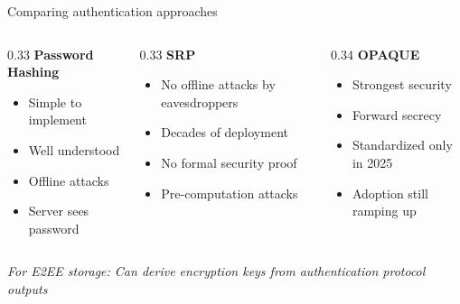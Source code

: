 \ifdefined\PRESENTATION\else\PassOptionsToClass{handout}{beamer}\fi\documentclass[aspectratio=169, lualatex]{beamer}
\begin{document}
\begin{frame}{Comparing authentication approaches}
	\begin{columns}
		\begin{column}{0.33\textwidth}
			\textbf{Password Hashing}
			\vspace{0.3cm}
			\begin{itemize}
				\item[\textcolor{green}{\mycheckmark}] Simple to implement
				\item[\textcolor{green}{\mycheckmark}] Well understood
				\item[\textcolor{red}{$\times$}] Offline attacks
				\item[\textcolor{red}{$\times$}] Server sees password
			\end{itemize}
		\end{column}
		\begin{column}{0.33\textwidth}
			\textbf{SRP}
			\vspace{0.3cm}
			\begin{itemize}
				\item[\textcolor{green}{\mycheckmark}] No offline attacks by eavesdroppers
				\item[\textcolor{green}{\mycheckmark}] Decades of deployment
				\item[\textcolor{red}{$\times$}] No formal security proof
				\item[\textcolor{red}{$\times$}] Pre-computation attacks
			\end{itemize}
		\end{column}
		\begin{column}{0.34\textwidth}
			\textbf{OPAQUE}
			\vspace{0.3cm}
			\begin{itemize}
				\item[\textcolor{green}{\mycheckmark}] Strongest security
				\item[\textcolor{green}{\mycheckmark}] Forward secrecy
				\item[\textcolor{red}{$\times$}] Standardized only in 2025
				\item[\textcolor{red}{$\times$}] Adoption still ramping up
			\end{itemize}
		\end{column}
	\end{columns}
	\vspace{0.5cm}
	\begin{center}
		\textit{For E2EE storage: Can derive encryption keys from authentication protocol outputs}
	\end{center}
\end{frame}
\end{document}
